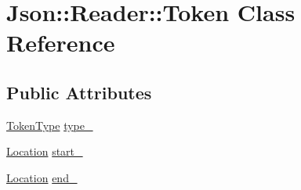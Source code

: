 \hypertarget{classJson_1_1Reader_1_1Token}{\section{Json\-:\-:Reader\-:\-:Token Class Reference}
\label{d2/d8f/classJson_1_1Reader_1_1Token}
}
\subsection*{Public Attributes}
\begin{DoxyCompactItemize}
\item 
\hyperlink{classJson_1_1Reader_aa35e6ab574dc399a0a645ad98ed66bc9}{Token\-Type} \hyperlink{classJson_1_1Reader_1_1Token_aa0f06d0105ec3d8cb42427c66b991bad}{type\-\_\-}
\item 
\hyperlink{classJson_1_1Reader_a46795b5b272bf79a7730e406cb96375a}{Location} \hyperlink{classJson_1_1Reader_1_1Token_aff87d677b9ac4b52542a00b0d6673249}{start\-\_\-}
\item 
\hyperlink{classJson_1_1Reader_a46795b5b272bf79a7730e406cb96375a}{Location} \hyperlink{classJson_1_1Reader_1_1Token_a7d3bc0fa40097f435d184be4b1fd5ae1}{end\-\_\-}
\end{DoxyCompactItemize}


